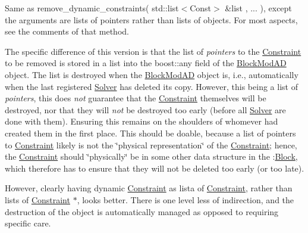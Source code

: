 Same as remove\+\_\+dynamic\+\_\+constraints( std\+::list$<$\+Const$>$ \&list , ... ), except the arguments are lists of pointers rather than lists of objects. For most aspects, see the comments of that method.

The specific difference of this version is that the list of {\itshape pointers} to the \mbox{\hyperlink{class_s_m_spp__di__unipi__it_1_1_constraint}{Constraint}} to be removed is stored in a list into the boost\+::any field of the \mbox{\hyperlink{class_s_m_spp__di__unipi__it_1_1_block_mod_a_d}{Block\+Mod\+AD}} object. The list is destroyed when the \mbox{\hyperlink{class_s_m_spp__di__unipi__it_1_1_block_mod_a_d}{Block\+Mod\+AD}} object is, i.\+e., automatically when the last registered \mbox{\hyperlink{class_s_m_spp__di__unipi__it_1_1_solver}{Solver}} has deleted its copy. However, this being a list of {\itshape pointers}, this does {\itshape not} guarantee that the \mbox{\hyperlink{class_s_m_spp__di__unipi__it_1_1_constraint}{Constraint}} themselves will be destroyed, nor that they will {\itshape not} be destroyed too early (before all \mbox{\hyperlink{class_s_m_spp__di__unipi__it_1_1_solver}{Solver}} are done with them). Ensuring this remains on the shoulders of whomever had created them in the first place. This should be doable, because a list of pointers to \mbox{\hyperlink{class_s_m_spp__di__unipi__it_1_1_constraint}{Constraint}} likely is not the \char`\"{}physical representation\char`\"{} of the \mbox{\hyperlink{class_s_m_spp__di__unipi__it_1_1_constraint}{Constraint}}; hence, the \mbox{\hyperlink{class_s_m_spp__di__unipi__it_1_1_constraint}{Constraint}} should \char`\"{}physically\char`\"{} be in some other data structure in the \+:\mbox{\hyperlink{class_s_m_spp__di__unipi__it_1_1_block}{Block}}, which therefore has to ensure that they will not be deleted too early (or too late).

However, clearly having dynamic \mbox{\hyperlink{class_s_m_spp__di__unipi__it_1_1_constraint}{Constraint}} as lista of \mbox{\hyperlink{class_s_m_spp__di__unipi__it_1_1_constraint}{Constraint}}, rather than lists of \mbox{\hyperlink{class_s_m_spp__di__unipi__it_1_1_constraint}{Constraint}} $\ast$, looks better. There is one level less of indirection, and the destruction of the object is automatically managed as opposed to requiring specific care. \mbox{\label{class_s_m_spp__di__unipi__it_1_1_block_a1c7a7f0599403293cdb7cecd381329e3}} 
